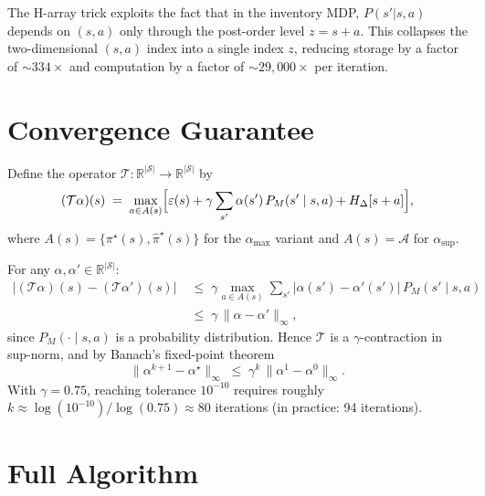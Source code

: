 \documentclass[11pt]{article}
\newcommand{\pistar}{\pi^\star}
\newcommand{\pihatstar}{\hat\pi^\star}
\begin{document}
The H-array trick exploits the fact that in the inventory MDP, $P(s'|s,a)$
depends on $(s,a)$ only through the post-order level $z = s + a$.  This
collapses the two-dimensional $(s,a)$ index into a single index $z$, reducing
storage by a factor of $\sim\!334\times$ and computation by a factor of
$\sim\!29{,}000\times$ per iteration.

\section{Convergence Guarantee}

Define the operator $\mathcal{T}\colon \mathbb{R}^{|\mathcal{S}|} \to
\mathbb{R}^{|\mathcal{S}|}$ by
\[
  (\mathcal{T}\alpha)(s)
  \;=\; \max_{a \in A(s)}
        \Bigl[\varepsilon(s) + \gamma \sum_{s'} \alpha(s')\, P_M(s' \mid s, a)
        + H_\Delta[s+a]\Bigr],
\]
where $A(s) = \{\pistar(s), \pihatstar(s)\}$ for the $\alpha_{\max}$ variant
and $A(s) = \mathcal{A}$ for $\alpha_{\sup}$.

For any $\alpha, \alpha' \in \mathbb{R}^{|\mathcal{S}|}$:
\begin{align*}
  \bigl|(\mathcal{T}\alpha)(s) - (\mathcal{T}\alpha')(s)\bigr|
  &\;\le\; \gamma \max_{a \in A(s)} \sum_{s'} \bigl|\alpha(s') - \alpha'(s')\bigr|
           \, P_M(s' \mid s, a) \\
  &\;\le\; \gamma \,\|\alpha - \alpha'\|_\infty,
\end{align*}
since $P_M(\cdot \mid s, a)$ is a probability distribution.  Hence $\mathcal{T}$
is a $\gamma$-contraction in sup-norm, and by Banach's fixed-point theorem
\[
  \|\alpha^{k+1} - \alpha^\star\|_\infty
  \;\le\; \gamma^k \, \|\alpha^1 - \alpha^0\|_\infty.
\]
With $\gamma = 0.75$, reaching tolerance $10^{-10}$ requires roughly
$k \approx \log(10^{-10}) / \log(0.75) \approx 80$ iterations (in practice:
94 iterations).

\section{Full Algorithm}
\end{document}
